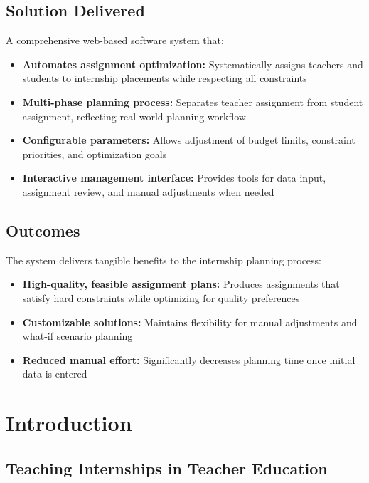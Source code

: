 \documentclass[12pt,a4paper]{report}
\begin{document}
\section*{Solution Delivered}
A comprehensive web-based software system that:
\begin{itemize}
    \item \textbf{Automates assignment optimization:} Systematically assigns teachers and students to internship placements while respecting all constraints
    \item \textbf{Multi-phase planning process:} Separates teacher assignment from student assignment, reflecting real-world planning workflow
    \item \textbf{Configurable parameters:} Allows adjustment of budget limits, constraint priorities, and optimization goals
    \item \textbf{Interactive management interface:} Provides tools for data input, assignment review, and manual adjustments when needed
\end{itemize}

\section*{Outcomes}
The system delivers tangible benefits to the internship planning process:
\begin{itemize}
    \item \textbf{High-quality, feasible assignment plans:} Produces assignments that satisfy hard constraints while optimizing for quality preferences
    \item \textbf{Customizable solutions:} Maintains flexibility for manual adjustments and what-if scenario planning
    \item \textbf{Reduced manual effort:} Significantly decreases planning time once initial data is entered
\end{itemize}

\tableofcontents
\newpage

\chapter{Introduction}

\section{Teaching Internships in Teacher Education}
\end{document}
